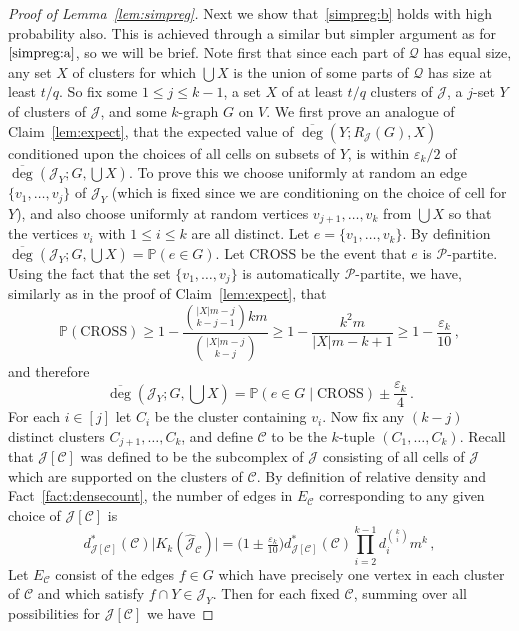 \documentclass[12pt,a4paper]{amsart}
\let\eps\varepsilon
\newcommand{\Prob}{\mathbb{P}}
\newcommand{\cJ}{\mathcal{J}}
\newcommand{\Part}{\mathcal{P}}
\newcommand{\Qart}{\mathcal{Q}}
\newcommand{\reld}{d^*}
\newcommand{\reldeg}{\overline{\deg}}
\newcommand{\CROSS}{\mathrm{CROSS}}
\begin{document}
\begin{proof}[Proof of Lemma~\ref{lem:simpreg}]
Next we show that~\ref{simpreg:b} holds with high probability also.
This is achieved through a similar but simpler argument as
for~$\ref{simpreg:a}$, so we will be brief. Note first that since each part
of $\Qart$ has equal size, any set $X$ of clusters for which $\bigcup X$ is the union of some parts of $\Qart$ has size at least $t/q$. So fix some $1 \leq j \leq k-1$, a set
$X$ of at least $t/q$ clusters of $\cJ$, a $j$-set $Y$ of clusters
of $\cJ$, and some $k$-graph $G$ on $V$. We first prove an analogue of
Claim~\ref{lem:expect}, that the expected value of $\reldeg(Y;R_\cJ(G), X)$
conditioned upon the choices of all cells on subsets of $Y$, is within
$\eps_k/2$ of $\reldeg(\cJ_Y; G, \bigcup X)$.
To prove this we choose uniformly at random an edge $\{v_1, \dots, v_j\}$ of
$\cJ_Y$ (which is fixed since we are conditioning on the choice of cell for
$Y$), and also choose uniformly at random vertices $v_{j+1}, \dots, v_k$ from $\bigcup
X$ so that the vertices $v_i$ with $1\le i\le k$ are all distinct. Let $e = \{v_1, \dots, v_k\}$.
By definition $\reldeg(\cJ_Y; G, \bigcup X) = \Prob(e \in G)$. Let
$\CROSS$ be the event that $e$ is $\Part$-partite. Using the fact that
the set $\{v_1,\ldots,v_j\}$ is automatically $\Part$-partite, 
we have, similarly as
in the proof
of Claim~\ref{lem:expect}, that
\begin{equation*}
 \Prob(\CROSS) \geq 1 - \frac{\binom{|X|m-j}{k-j-1}km}{\binom{|X|m-j}{k-j}}\ge 1-\frac{k^2m}{|X|m-k+1}\ge 1-\frac{\eps_k}{10}\,,
\end{equation*}
and therefore 
\begin{equation}\label{eq:simpreg:degexpect}\reldeg(\cJ_Y; G, \bigcup X) = \Prob(e \in G \mid \CROSS) \pm
\frac{\eps_k}{4}\,.
\end{equation}
For each $i \in [j]$ let $C_i$ be the cluster containing $v_i$. Now fix any $(k-j)$ distinct clusters 
$C_{j+1}, \dots, C_{k}$, and define $\mathcal{C}$ to be the $k$-tuple $(C_1, \dots, C_k)$. 
Recall that $\cJ[\mathcal{C}]$ was defined to be the subcomplex of $\cJ$ consisting of all 
cells of $\cJ$ which are supported on the clusters of $\mathcal{C}$. By definition of 
relative density and Fact~\ref{fact:densecount}, the number of edges in $E_\mathcal{C}$
corresponding to any given choice of $\cJ[\mathcal{C}]$ is 
\[\reld_{\cJ[\mathcal{C}]}(\mathcal{C}) \big|K_k(\hat{\cJ}_\mathcal{C})\big| = \big(1 \pm \tfrac{\eps_k}{10}\big)
\reld_{\cJ[\mathcal{C}]}(\mathcal{C}) \prod_{i=2}^{k-1} d_i^{\binom{k}{i}} m^k\,,\]
Let $E_{\mathcal{C}}$ consist of the edges $f \in G$ which have precisely one vertex in each cluster of $\mathcal{C}$ and which satisfy $f \cap Y \in \cJ_Y$. Then for each fixed $\mathcal{C}$, summing over all possibilities for $\cJ[\mathcal{C}]$ we have

\end{proof}
\end{document}
